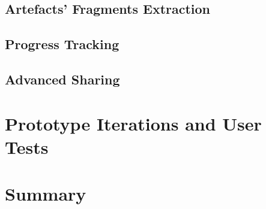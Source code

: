 \subsection{Artefacts' Fragments Extraction}

\subsection{Progress Tracking}

\subsection{Advanced Sharing}

\section{Prototype Iterations and User Tests}
 
\section{Summary}